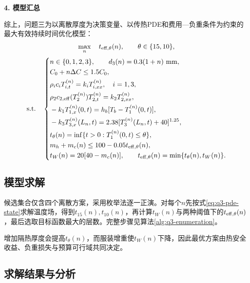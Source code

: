 \noindent\textbf{4. 模型汇总}\par
综上，问题三为以离散厚度为决策变量、以传热PDE和费用—负重条件为约束的最大有效持续时间优化模型：
\vspace{-0.3\baselineskip}
{\boldmath
\begin{equation}
\max_{n}\quad t_{\rm eff,\theta}(n),\qquad \theta\in\{15,10\},
\label{eq:q3-summary-obj}
\end{equation}}
{\boldmath
\begin{equation}
\mathrm{s.t.}\quad
\left\{
\begin{aligned}
&n\in\{0,1,2,3\},\qquad d_3(n)=0.3(1+n)\ \mathrm{mm},\\
&C_0+n\Delta C\le1.5C_0,\\
&\rho_i c_iT_{i,t}^{(n)}=k_iT_{i,xx}^{(n)},\quad i=1,3,\\
&\rho_2c_{2,\mathrm{eff}}(T_2^{(n)})T_{2,t}^{(n)}=k_2T_{2,xx}^{(n)},\\
&-k_1T_{1,x}^{(n)}(0,t)=h_b[T_b-T_1^{(n)}(0,t)],\\
&-k_3T_{3,x}^{(n)}(L_n,t)=2.38[T_3^{(n)}(L_n,t)+40]^{1.25},\\
&t_\theta(n)=\inf\{t>0:T_1^{(n)}(0,t)\le\theta\},\\
&m_h+m_c(n)\le100-0.05t_{\rm eff,\theta}(n),\\
&t_W(n)=20[40-m_c(n)],\qquad t_{\rm eff,\theta}(n)=\min\{t_\theta(n),t_W(n)\}.
\end{aligned}
\right.
\label{eq:q3-summary-con}
\end{equation}}

\subsection{模型求解}

候选集合仅含四个离散方案，采用枚举法逐一正演。对每个$n$先按式\eqref{eq:q3-pde-state}求解温度场，得到$t_{15}(n),t_{10}(n)$，再计算$t_W(n)$与两种阈值下的$t_{\rm eff,\theta}(n)$，最后选取目标函数最大的层数。完整步骤见算法\ref{alg:q3-enumeration}。



增加隔热厚度会提高$t_\theta(n)$，而服装增重使$t_W(n)$下降，因此最优方案由热安全收益、负重损失与预算可行域共同决定。

\subsection{求解结果与分析}

